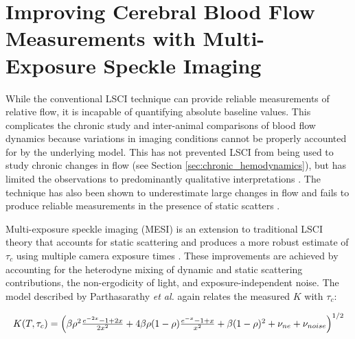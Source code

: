 
\chapter{Improving Cerebral Blood Flow Measurements with Multi-Exposure Speckle Imaging} \label{ch:mesi}

While the conventional LSCI technique can provide reliable measurements of relative flow, it is incapable of quantifying absolute baseline values. This complicates the chronic study and inter-animal comparisons of blood flow dynamics because variations in imaging conditions cannot be properly accounted for by the underlying model. This has not prevented LSCI from being used to study chronic changes in flow (see Section \ref{sec:chronic_hemodynamics}), but has limited the observations to predominantly qualitative interpretations \cite{Armitage:2010ga}. The technique has also been shown to underestimate large changes in flow and fails to produce reliable measurements in the presence of static scatters \cite{Parthasarathy:2008el}.

Multi-exposure speckle imaging (MESI) is an extension to traditional LSCI theory that accounts for static scattering and produces a more robust estimate of $\tau_c$ using multiple camera exposure times \cite{Parthasarathy:2008el}. These improvements are achieved by accounting for the heterodyne mixing of dynamic and static scattering contributions, the non-ergodicity of light, and exposure-independent noise. The model described by Parthasarathy \textit{et al.} \cite{Parthasarathy:2008el} again relates the measured $K$ with $\tau_c$:

\begin{equation}
    \label{eq:mesi}
    \resizebox{\textwidth}{!}{$
    K(T,\tau_c) =
        \left(
        \beta\rho^2\frac{e^{-2x} - 1 + 2x}{2x^2} +
        4\beta\rho(1 - \rho)\frac{e^{-x} - 1 + x}{x^2} +
        \beta(1 - \rho)^2 +
        \nu_{ne} +
        \nu_{noise}
        \right)^{1/2}
    $}
\end{equation}


